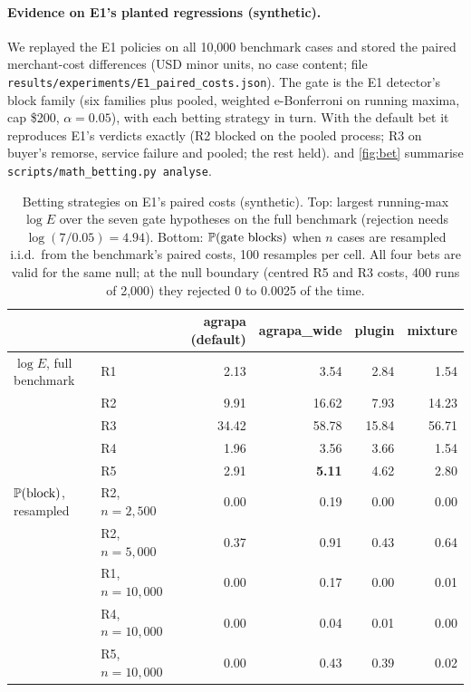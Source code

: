 \paragraph{Evidence on E1's planted regressions (synthetic).} We replayed the E1 policies on all 10{,}000 benchmark cases and stored the paired merchant-cost differences (USD minor units, no case content; file \nolinkurl{results/experiments/E1_paired_costs.json}). The gate is the E1 detector's block family (six families plus pooled, weighted e-Bonferroni on running maxima, cap \$200, $\alpha=0.05$), with each betting strategy in turn. With the default bet it reproduces E1's verdicts exactly (R2 blocked on the pooled process; R3 on buyer's remorse, service failure and pooled; the rest held).  and \cref{fig:bet} summarise \texttt{scripts/math\_betting.py analyse}.

\begin{table}[h]
\centering\footnotesize
\caption{Betting strategies on E1's paired costs (synthetic). Top: largest running-max $\log E$ over the seven gate hypotheses on the full benchmark (rejection needs $\log(7/0.05)=4.94$). Bottom: $\P(\text{gate blocks})$ when $n$ cases are resampled i.i.d.\ from the benchmark's paired costs, 100 resamples per cell. All four bets are valid for the same null; at the null boundary (centred R5 and R3 costs, 400 runs of 2{,}000) they rejected 0 to 0.0025 of the time.}\label{tab:bet}
\begin{tabular}{@{}llrrrr@{}}
\toprule
 & & agrapa (default) & agrapa\_wide & plugin & mixture\\
\midrule
$\log E$, full benchmark & R1 & 2.13 & 3.54 & 2.84 & 1.54\\
 & R2 & 9.91 & 16.62 & 7.93 & 14.23\\
 & R3 & 34.42 & 58.78 & 15.84 & 56.71\\
 & R4 & 1.96 & 3.56 & 3.66 & 1.54\\
 & R5 & 2.91 & \textbf{5.11} & 4.62 & 2.80\\
\midrule
$\P(\text{block})$, resampled & R2, $n=2{,}500$ & 0.00 & 0.19 & 0.00 & 0.00\\
 & R2, $n=5{,}000$ & 0.37 & 0.91 & 0.43 & 0.64\\
 & R1, $n=10{,}000$ & 0.00 & 0.17 & 0.00 & 0.01\\
 & R4, $n=10{,}000$ & 0.00 & 0.04 & 0.01 & 0.00\\
 & R5, $n=10{,}000$ & 0.00 & 0.43 & 0.39 & 0.02\\
\bottomrule
\end{tabular}
\end{table}

